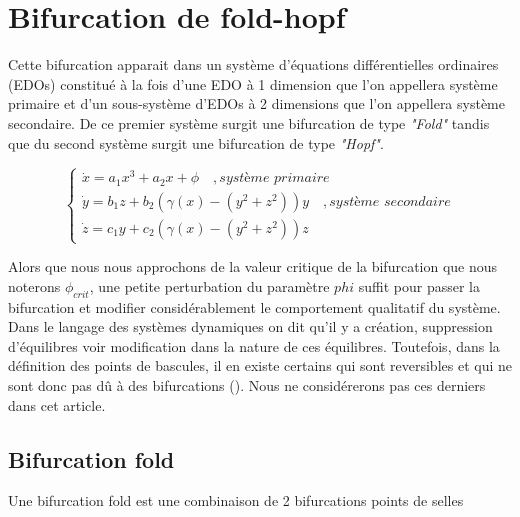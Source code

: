 \section{Bifurcation de fold-hopf}

Cette bifurcation apparait dans un système d'équations différentielles ordinaires (EDOs) constitué à la fois d'une EDO à 1 dimension que l'on appellera système primaire et d'un sous-système d'EDOs à 2 dimensions que l'on appellera système secondaire. De ce premier système surgit une bifurcation de type \emph{"Fold"} tandis que du second système surgit une bifurcation de type \emph{"Hopf"}.

\begin{equation}
  \begin{cases}
    \dot{x} = a_1x^3 + a_2x + \phi \quad, \textit{système primaire} \\
    \dot{y} = b_1z + b_2(\gamma(x) - (y^2 + z^2))y \quad, \textit{système secondaire} \\
    \dot{z} = c_1y + c_2(\gamma(x) - (y^2 + z^2))z
  \end{cases}
\end{equation}

Alors que nous nous approchons de la valeur critique de la bifurcation que nous noterons $\phi_{crit}$, une petite perturbation du paramètre $phi$ suffit pour passer la bifurcation et modifier considérablement le comportement qualitatif du système. Dans le langage des systèmes dynamiques on dit qu'il y a création, suppression d'équilibres voir modification dans la nature de ces équilibres. Toutefois, dans la définition des points de bascules, il en existe certains qui sont reversibles et qui ne sont donc pas dû à des bifurcations (\cite{lenton_tipping_2008}). Nous ne considérerons pas ces derniers dans cet article.

\subsection{Bifurcation fold}

Une bifurcation fold est une combinaison de 2 bifurcations points de selles

